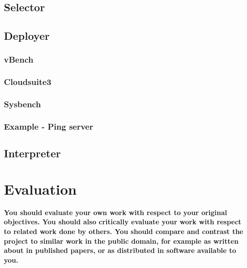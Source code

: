 \documentclass{article}
\begin{document}
\subsection{Selector}

\subsection{Deployer}
\subsubsection{vBench}
\subsubsection{Cloudsuite3}
\subsubsection{Sysbench}
\subsubsection{Example - Ping server}


\subsection{Interpreter}
\section{Evaluation}
\textbf{You should evaluate your own work with respect to your original objectives. You should also critically evaluate your work with respect to related work done by others. You should compare and contrast the project to similar work in the public domain, for example as written about in published papers, or as distributed in software available to you.}
\end{document}
